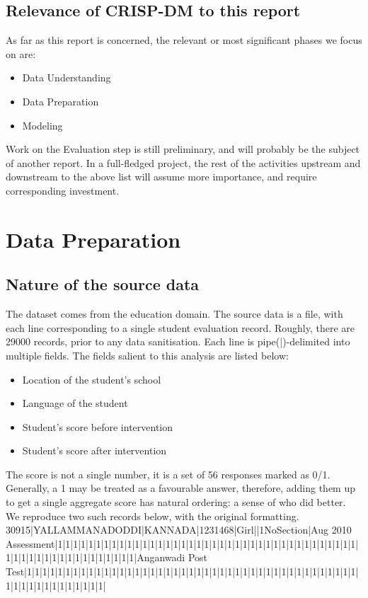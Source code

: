 \documentclass[10pt]{article}
\begin{document}
\subsection{Relevance of CRISP-DM to this report}
As far as this report is concerned, the relevant or most significant phases we focus on are:
\begin{itemize}
\item Data Understanding
\item Data Preparation
\item Modeling
\end{itemize}

Work on the Evaluation step is still preliminary, and will probably be the subject of another report. In a full-fledged project, the rest of the activities upstream and downstream to the above list will assume more importance, and require corresponding investment.

\newpage
\section{Data Preparation}
\subsection{Nature of the source data}
The dataset comes from the education domain. The source data is a file, with each line corresponding to a single student evaluation record. Roughly, there are 29000 records, prior to any data sanitisation. Each line is pipe(|)-delimited into multiple fields. The fields salient to this analysis are listed below:

\begin{itemize}
\item Location of the student's school
\item Language of the student
\item Student's score before intervention
\item Student's score after intervention
\end{itemize}

The score is not a single number, it is a set of 56 responses marked as 0/1. Generally, a 1 may be treated as a favourable answer, therefore, adding them up to get a single aggregate score has natural ordering: a sense of who did better. We reproduce two such records below, with the original formatting.\\

{\footnotesize 30915|YALLAMMANADODDI|KANNADA|1231468|Girl||1NoSection|Aug 2010 Assessment|1|1|1|1|1|1|1|1|1|1|1|1|1|1|1|1|1|1|1|1|1|1|1|1|1|1|1|1|1|1|1|1|1|1|1|1|1|1|1|1|1|1|1|1|1|1|1|1|1|1|1|1|1|1|1|1|Anganwadi Post Test|1|1|1|1|1|1|1|1|1|1|1|1|1|1|1|1|1|1|1|1|1|1|1|1|1|1|1|1|1|1|1|1|1|1|1|1|1|1|1|1|1|1|1|1|1|1|1|1|1|1|1|1|1|1|1|1|}\\
\end{document}

